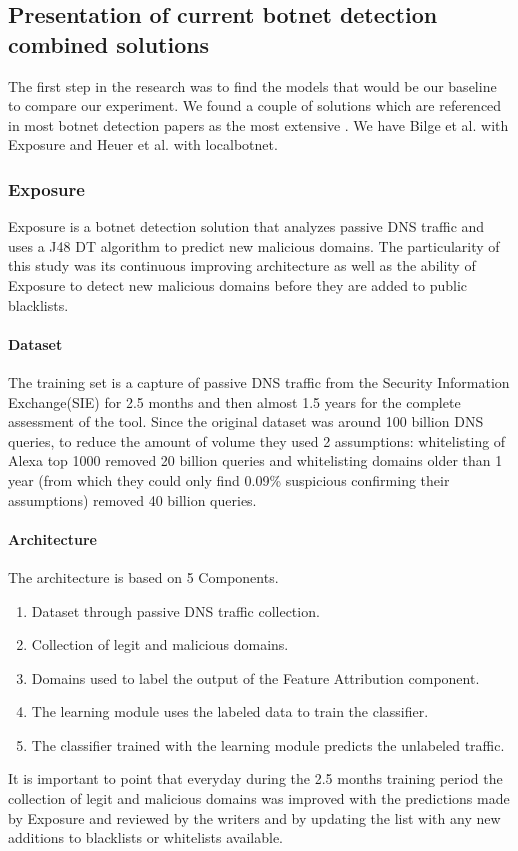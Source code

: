\subsection{Presentation of current botnet detection combined solutions}
The first step in the research was to find the models that would be our baseline to compare our experiment. We found a couple of solutions which are referenced in most botnet detection papers as the most extensive . We have Bilge et al.\cite{exposure} with Exposure and Heuer et al.\cite{localbotnet} with localbotnet.

\subsubsection{Exposure}
Exposure is a botnet detection solution that analyzes passive DNS traffic and uses a J48 DT algorithm to predict new malicious domains. The particularity of this study was its continuous improving architecture as well as the ability of Exposure to detect new malicious domains before they are added to public blacklists.
\paragraph{Dataset}
The training set is a capture of passive DNS traffic from the Security Information Exchange(SIE) for 2.5 months and then almost 1.5 years for the complete assessment of the tool. Since the original dataset was around 100 billion DNS queries, to reduce the amount of volume they used 2 assumptions: whitelisting of Alexa top 1000  removed 20 billion queries and whitelisting domains older than 1 year (from which they could only find 0.09\% suspicious confirming their assumptions) removed 40 billion queries.
\paragraph{Architecture}
The architecture is based on 5 Components. 
\begin{enumerate}
\item Dataset through passive DNS traffic collection.
\item Collection of legit and malicious domains.
\item Domains used to label the output of the Feature Attribution component.
\item The learning module uses the labeled data to train the classifier.
\item The classifier trained with the learning module predicts the unlabeled traffic.
\end{enumerate}
It is important to point that everyday during the 2.5 months training period the collection of legit and malicious domains was improved with the predictions made by Exposure and reviewed by the writers and by updating the list with any new additions to blacklists or whitelists available.

